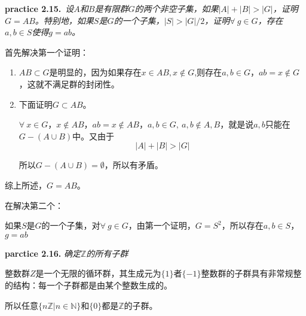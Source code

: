 \begin{mdframed}
    \textbf{practice 2.15.}\ \textsl{设$A$和$B$是有限群$G$的两个非空子集，如果$|A|+|B|>|G|$，证明$G=AB$。特别地，如果$S$是$G$的一个子集，$|S|>|G|/2$，证明$\forall\ g\in G$，存在$a,b\in S$使得$g=ab$。}

    \vspace*{1em}
    首先解决第一个证明：
    \begin{enumerate}
        \item $AB \subset G$是明显的，因为如果存在$x\in AB,x\notin G$,则存在$a,b\in G$，$ab=x\notin G$，这就不满足群的封闭性。
        \item 下面证明$G\subset AB$。
    
        $\forall\ x\in G$，$x\notin AB$，$ab=x\notin AB$，$a,b\in G,\ a,b\notin A,B$，就是说$a,b$只能在$G-(A\cup B)$中。又由于
        \begin{equation}
            |A|+|B|>|G|
        \end{equation}

        所以$G-(A\cup B)=\emptyset$，所以有矛盾。
    \end{enumerate}

    综上所述，$G=AB$。

    \hspace*{1em}

    在解决第二个：

    如果$S$是$G$的一个子集，对$\forall\ g\in G$，由第一个证明，$G=S^2$，所以存在$a,b\in S$，$g=ab$
\end{mdframed}

\newpage

\begin{mdframed}
    \textbf{parctice 2.16.} \textsl{确定$\mathbb{Z}$的所有子群}

    整数群$Z$是一个无限的循环群，其生成元为$\{1\}$者$\{-1\}$整数群的子群具有非常规整的结构：每一个子群都是由某个整数生成的。

    所以任意$\{n\mathbb{Z}|n\in \mathbb{N}\}$和$\{0\}$都是$\mathbb{Z}$的子群。
\end{mdframed}

